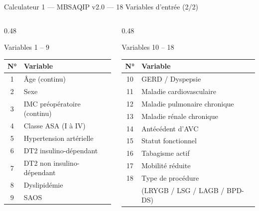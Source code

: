 \documentclass[aspectratio=169]{beamer}
\begin{document}
\begin{frame}{Calculateur 1 --- MBSAQIP v2.0 --- 18 Variables d'entrée (2/2)}
  \begin{columns}[T]
    \begin{column}{0.48\textwidth}
      \begin{block}{Variables 1 -- 9}
        \footnotesize
        \begin{tabular}{cl}
          \toprule
          \textbf{N°} & \textbf{Variable} \\
          \midrule
          1  & Âge (continu) \\
          2  & Sexe \\
          3  & IMC préopératoire (continu) \\
          4  & Classe ASA (I à IV) \\
          5  & Hypertension artérielle \\
          6  & DT2 insulino-dépendant \\
          7  & DT2 non insulino-dépendant \\
          8  & Dyslipidémie \\
          9  & SAOS \\
          \bottomrule
        \end{tabular}
      \end{block}
    \end{column}
    \begin{column}{0.48\textwidth}
      \begin{block}{Variables 10 -- 18}
        \footnotesize
        \begin{tabular}{cl}
          \toprule
          \textbf{N°} & \textbf{Variable} \\
          \midrule
          10 & GERD / Dyspepsie \\
          11 & Maladie cardiovasculaire \\
          12 & Maladie pulmonaire chronique \\
          13 & Maladie rénale chronique \\
          14 & Antécédent d'AVC \\
          15 & Statut fonctionnel \\
          16 & Tabagisme actif \\
          17 & Mobilité réduite \\
          18 & Type de procédure \\
          & (LRYGB / LSG / LAGB / BPD-DS) \\

\end{tabular}
\end{block}
\end{column}
\end{columns}
\end{frame}
\end{document}
